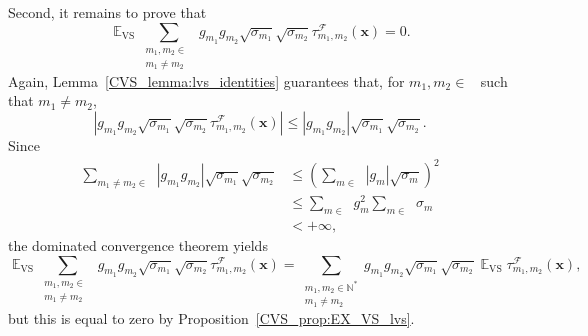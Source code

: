 \documentclass[twoside,11pt]{book}
\numberwithin{theorem}{chapter}
\numberwithin{definition}{chapter}
\numberwithin{proposition}{chapter}
\numberwithin{corollary}{chapter}
\numberwithin{example}{chapter}
\numberwithin{lemma}{chapter}
\numberwithin{assumption}{chapter}
\numberwithin{equation}{chapter}
\numberwithin{figure}{chapter}
\DeclareMathOperator{\VS}{\mathrm{VS}}
\DeclareMathOperator{\EX}{\mathbb{E}}
\DeclareMathOperator{\F}{\mathcal{F}}
\DeclareMathOperator{\Ns}{\mathbb{N}^{*}}
\begin{document}
Second, it remains to prove that
\begin{equation}\label{CVS_eq:interchange_EX_VS_cross_lvs}
\EX_{\VS} \sum\limits_{\substack{m_{1},m_{2} \in \Ns \\ m_{1} \neq m_{2}}}  g_{m_{1}}g_{m_{2}} \sqrt{\sigma_{m_{1}}} \sqrt{\sigma_{m_{2}}} \tau_{m_{1},m_{2}}^{\F}(\bm{x})
= 0.
\end{equation}
Again, Lemma~\ref{CVS_lemma:lvs_identities} guarantees that, for $m_{1},m_{2} \in \Ns$ such that $m_{1} \neq m_{2}$,
\begin{equation}
| g_{m_{1}}g_{m_{2}} \sqrt{\sigma_{m_{1}}} \sqrt{\sigma_{m_{2}}} \tau_{m_{1},m_{2}}^{\F}(\bm{x})| \leq | g_{m_{1}}g_{m_{2}} | \sqrt{\sigma_{m_{1}}} \sqrt{\sigma_{m_{2}}}.
\end{equation}
Since
\begin{align}
\sum\limits_{m_{1} \neq m_{2} \in \Ns} |g_{m_{1}}g_{m_{2}}| \sqrt{\sigma_{m_{1}}} \sqrt{\sigma_{m_{2}}}
& \leq  \left(\sum\limits_{m \in \Ns} |g_{m}| \sqrt{\sigma_{m}} \right)^{2} \nonumber \\
& \leq \sum\limits_{m \in \Ns}g_{m}^{2} \sum\limits_{m \in \Ns} \sigma_{m} \nonumber \\
& < + \infty,
\end{align}
the dominated convergence theorem yields 
$$
\EX_{\VS} \sum\limits_{\substack{m_{1},m_{2} \in \Ns \\ m_{1} \neq m_{2}}}  g_{m_{1}}g_{m_{2}} \sqrt{\sigma_{m_{1}}} \sqrt{\sigma_{m_{2}}} \tau_{m_{1},m_{2}}^{\F}(\bm{x})
= \sum\limits_{\substack{m_{1},m_{2} \in \mathbb{N}^{*} \\ m_{1} \neq m_{2}}}  g_{m_{1}}g_{m_{2}} \sqrt{\sigma_{m_{1}}} \sqrt{\sigma_{m_{2}}} \EX_{\VS} \tau_{m_{1},m_{2}}^{\F}(\bm{x}),
$$
but this is equal to zero by Proposition~\ref{CVS_prop:EX_VS_lvs}.
\end{document}
